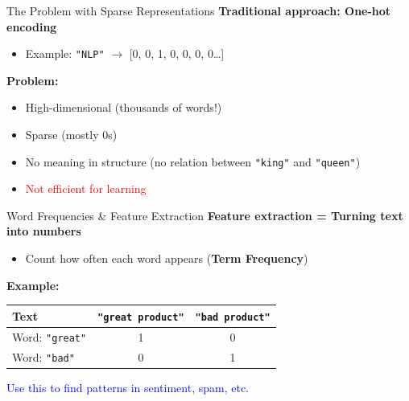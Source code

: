 \begin{frame}{The Problem with Sparse Representations}
    \textbf{Traditional approach: One-hot encoding}
    \begin{itemize}
        \item Example: \texttt{"NLP"} $\rightarrow$ [0, 0, 1, 0, 0, 0, 0\ldots]
    \end{itemize}
    \vspace{1em}
    \textbf{Problem:}
    \begin{itemize}
        \item High-dimensional (thousands of words!)
        \item Sparse (mostly 0s)
        \item No meaning in structure (no relation between \texttt{"king"} and \texttt{"queen"})
        \item \textcolor{red}{\faTimes\enspace Not efficient for learning}
    \end{itemize}
\end{frame}

\begin{frame}{Word Frequencies \& Feature Extraction}
    \textbf{Feature extraction = Turning text into numbers}
    \begin{itemize}
        \item Count how often each word appears (\textbf{Term Frequency})
    \end{itemize}
    \vspace{1em}
    \textbf{Example:}
    \begin{table}[ht]
        \centering
        \renewcommand{\arraystretch}{1.8} %
        \begin{tabular}{lcc}
            \toprule
            \textbf{Text} & \texttt{"great product"} & \texttt{"bad product"} \\
            \midrule
            Word: \texttt{"great"} & 1 & 0 \\
            Word: \texttt{"bad"} & 0 & 1 \\
            \bottomrule
        \end{tabular}
    \end{table}
    \vspace{0.5em}
    \textcolor{blue}{\faBalanceScale\enspace Use this to find patterns in sentiment, spam, etc.}
\end{frame}

